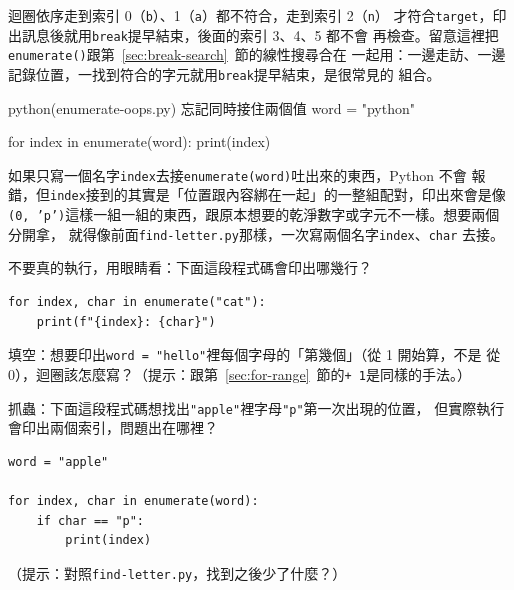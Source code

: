 
迴圈依序走到索引 0（\texttt{b}）、1（\texttt{a}）都不符合，走到索引 2（\texttt{n}）
才符合\texttt{target}，印出訊息後就用\texttt{break}提早結束，後面的索引 3、4、5 都不會
再檢查。留意這裡把\texttt{enumerate()}跟第~\ref{sec:break-search}~節的線性搜尋合在
一起用：一邊走訪、一邊記錄位置，一找到符合的字元就用\texttt{break}提早結束，是很常見的
組合。

\begin{example}{python}{(enumerate-oops.py) 忘記同時接住兩個值}
word = "python"

for index in enumerate(word):
    print(index)
\end{example}


如果只寫一個名字\texttt{index}去接\texttt{enumerate(word)}吐出來的東西，Python 不會
報錯，但\texttt{index}接到的其實是「位置跟內容綁在一起」的一整組配對，印出來會是像
\texttt{(0, 'p')}這樣一組一組的東西，跟原本想要的乾淨數字或字元不一樣。想要兩個分開拿，
就得像前面\texttt{find-letter.py}那樣，一次寫兩個名字\texttt{index}、\texttt{char}
去接。


\begin{drills}[label=drills:enumerate]
\item 不要真的執行，用眼睛看：下面這段程式碼會印出哪幾行？
\begin{verbatim}
for index, char in enumerate("cat"):
    print(f"{index}: {char}")
\end{verbatim}
\item 填空：想要印出\texttt{word = "hello"}裡每個字母的「第幾個」（從 1 開始算，不是
從 0），迴圈該怎麼寫？（提示：跟第~\ref{sec:for-range}~節的\texttt{+ 1}是同樣的手法。）
\item 抓蟲：下面這段程式碼想找出\texttt{"apple"}裡字母\texttt{"p"}第一次出現的位置，
但實際執行會印出兩個索引，問題出在哪裡？
\begin{verbatim}
word = "apple"

for index, char in enumerate(word):
    if char == "p":
        print(index)
\end{verbatim}
（提示：對照\texttt{find-letter.py}，找到之後少了什麼？）
\end{drills}

